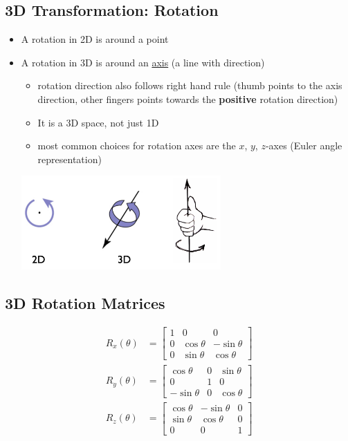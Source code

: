 \documentclass[10pt]{article}
\begin{document}
\subsection*{3D Transformation: Rotation}
\begin{itemize}
	\item A rotation in 2D is around a point
	\item A rotation in 3D is around an \underline{axis} (a line with direction)
	\begin{itemize}
        \item rotation direction also follows right hand rule (thumb points to the axis direction, other fingers points towards the \textbf{positive} rotation direction)
        \item It is a 3D space, not just 1D
        \item most common choices for rotation axes are the $x$, $y$, $z$-axes (Euler angle representation)
    \end{itemize}
    \begin{center} 
        \includegraphics*[width=0.6\textwidth]{L1_7.png} 
    \end{center}
    
\end{itemize}

\subsection*{3D Rotation Matrices}
\begin{align*}
R_x (\theta) &= \begin{bmatrix} 1 & 0 & 0 \\ 0 & \cos \theta & -\sin \theta \\ 0 & \sin \theta & \cos \theta \end{bmatrix}\\
R_y (\theta) &= \begin{bmatrix} \cos \theta & 0 & \sin \theta \\ 0 & 1 & 0 \\ -\sin \theta & 0 & \cos \theta \end{bmatrix}\\
R_z (\theta) &= \begin{bmatrix} \cos \theta & -\sin \theta & 0 \\ \sin \theta & \cos \theta & 0 \\ 0 & 0 & 1 \end{bmatrix}
\end{align*}
\end{document}
